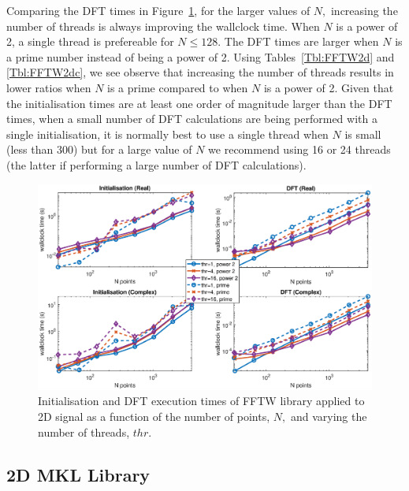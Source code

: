 \documentclass[a4paper]{article}
\begin{document}
Comparing the DFT times in Figure~\ref{2DFFTW}, for the larger values
of $N,$ increasing the number of threads is always improving the
wallclock time. When $N$ is a power of 2, a single thread is
prefereable for $N\le 128.$ The DFT times are larger when $N$ is a
prime number instead of being a power of 2. Using
Tables~\ref{Tbl:FFTW2d} and \ref{Tbl:FFTW2dc}, we see observe that
increasing the number of threads results in lower ratios when $N$ is a
prime compared to when $N$ is a power of 2. Given that the
initialisation times are at least one order of magnitude larger than
the DFT times, when a small number of DFT calculations are being
performed with a single initialisation, it is normally best to use a
single thread when $N$ is small (less than 300) but for a large value
of $N$ we recommend using 16 or 24 threads (the latter if performing a
large number of DFT calculations).




\begin{figure}[htb]
    \centering
    \includegraphics[width=0.9\linewidth]{../results/fftw_2d_thr.eps}
  \caption{Initialisation and DFT execution times of FFTW library applied to 2D signal as a function of the
    number of points, $N,$ and varying the number of threads, $thr.$ }
  \label{2DFFTW}
\end{figure}



\subsection{2D MKL Library}\label{Sec:2DMKL}
\end{document}
